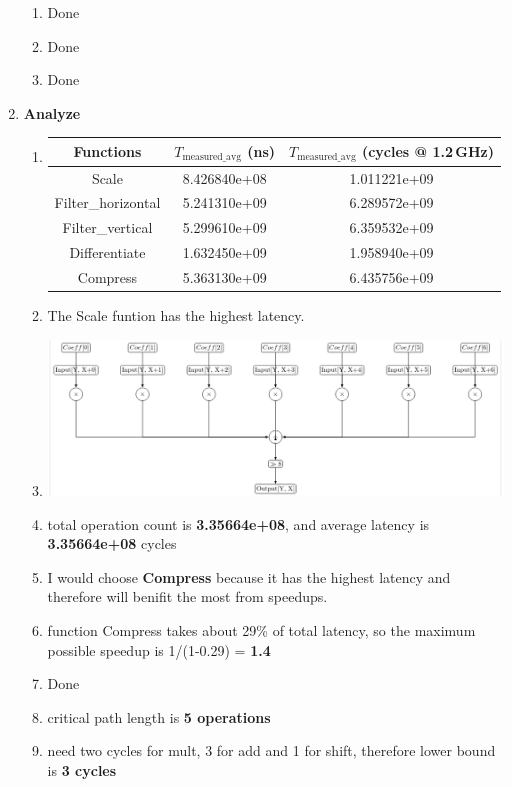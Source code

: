 \documentclass[12pt]{article}
\begin{document}
\begin{enumerate}
\begin{tabular}{|c|c|c|c|}
        \end{tabular}
        \begin{enumerate}[label=\arabic*)]
        \item Done
        \item Done
        \item Done

    \end{enumerate}

    \item \textbf{Analyze}
    \begin{enumerate}[label=\arabic*)]
        \item \begin{tabular}{|c|c|c|}
\hline
Functions & $T_{\text{measured\_avg}}$ (ns) & $T_{\text{measured\_avg}}$ (cycles @ 1.2\,GHz) \\
\hline
Scale             & 8.426840e+08 & 1.011221e+09 \\
\hline
Filter\_horizontal & 5.241310e+09 & 6.289572e+09 \\
\hline
Filter\_vertical   & 5.299610e+09 & 6.359532e+09 \\
\hline
Differentiate      & 1.632450e+09 & 1.958940e+09 \\
\hline
Compress           & 5.363130e+09 & 6.435756e+09 \\
\hline
\end{tabular}
    \item The Scale funtion has the highest latency.
    \item \includegraphics[width=1.0\textwidth]{3_3.png}
    \item total operation count is \textbf{3.35664e+08}, and average latency is \textbf{3.35664e+08} cycles
    \item I would choose \textbf{Compress} because it has the highest latency and therefore will benifit the most from speedups.
    \item function Compress takes about 29\% of total latency, so the maximum possible speedup is 1/(1-0.29) = \textbf{1.4}
    \item Done
    \item critical path length is \textbf{5 operations}
    \item need two cycles for mult, 3 for add and 1 for shift, therefore lower bound is \textbf{3 cycles}


\end{enumerate}
\end{enumerate}
\end{document}
